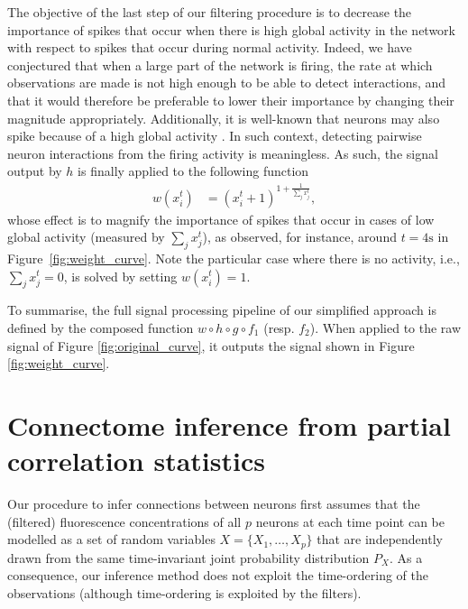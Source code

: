\documentclass[wcp]{jmlr}
\begin{document}
The objective of the last step of our filtering procedure is to decrease the
importance of spikes that occur when there is high global activity in the
network with respect to  spikes that occur during normal activity. Indeed, we
have conjectured that when a large part of the network is firing, the rate at
which observations are made is not high enough to be able to detect
interactions, and that it would therefore be preferable to lower their
importance by changing their magnitude appropriately. Additionally, it is
well-known that neurons may also spike because of a high global activity
\citep{stetter2012model}. In such  context, detecting pairwise neuron
interactions from the firing activity is meaningless. As such,
the signal output by $h$ is finally applied to the following function
\begin{align}
 w(x^{t}_i) &= (x^{t}_i + 1 )^{1 + \frac{1}{\sum_{j} x^{t}_j}}, \label{eq:magnify-filter}
\end{align}
whose effect is to magnify the importance of spikes that occur in cases of low
global activity (measured by $\sum_{j} x^{t}_j$), as observed, for instance,
around $t=4\text{s}$ in Figure~\ref{fig:weight_curve}. Note the particular case where there
is no activity, i.e., $\sum_{j} x^{t}_j = 0$, is solved by setting $w(x^{t}_i)
= 1$.

To summarise, the full signal processing pipeline of our simplified approach is defined by the composed function $w \circ h \circ g \circ
f_1$ (resp. $f_2$). When applied to the raw signal of Figure
\ref{fig:original_curve}, it outputs the signal shown in Figure
\ref{fig:weight_curve}.


\section{Connectome inference from partial correlation statistics}
\label{sec:inference}

Our procedure to infer connections between neurons first assumes that
the (filtered) fluorescence concentrations of all $p$ neurons at each
time point can be modelled as a set of random variables $X = \{X_1,
\dots, X_p\}$ that are independently drawn from the same time-invariant
joint probability distribution $P_X$. 
As a consequence, our inference method does not exploit the time-ordering of the observations (although time-ordering is exploited by
the filters).
\end{document}
